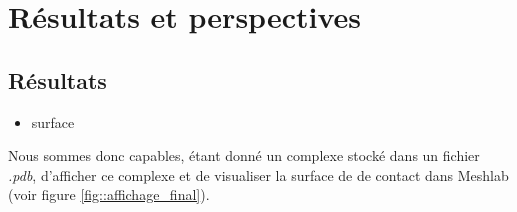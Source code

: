 \chapter{Résultats et perspectives}

\section{Résultats}
\begin{itemize}
  \item surface
\end{itemize}

Nous sommes donc capables, étant donné un complexe stocké dans un fichier \textit{.pdb},
d'afficher ce complexe et de visualiser la surface de de contact dans Meshlab
(voir figure \ref{fig::affichage_final}).

